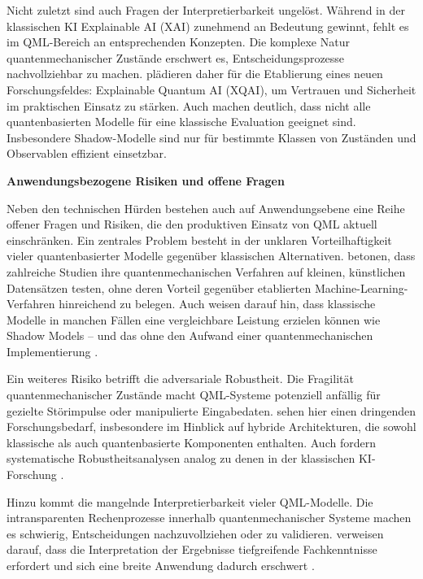 Nicht zuletzt sind auch Fragen der Interpretierbarkeit ungelöst. Während in der klassischen KI Explainable AI (XAI) zunehmend an Bedeutung gewinnt, fehlt es im QML-Bereich an entsprechenden Konzepten. Die komplexe Natur quantenmechanischer Zustände erschwert es, Entscheidungsprozesse nachvollziehbar zu machen. \cite[S.~15]{uddin2024} plädieren daher für die Etablierung eines neuen Forschungsfeldes: Explainable Quantum AI (XQAI), um Vertrauen und Sicherheit im praktischen Einsatz zu stärken. Auch \cite[S.~2--3]{jerbi2024} machen deutlich, dass nicht alle quantenbasierten Modelle für eine klassische Evaluation geeignet sind. Insbesondere Shadow-Modelle sind nur für bestimmte Klassen von Zuständen und Observablen effizient einsetzbar.



\vspace{1em}
\noindent\textbf{Anwendungsbezogene Risiken und offene Fragen}

\noindent
Neben den technischen Hürden bestehen auch auf Anwendungsebene eine Reihe offener Fragen und Risiken, die den produktiven Einsatz von QML aktuell einschränken. Ein zentrales Problem besteht in der unklaren Vorteilhaftigkeit vieler quantenbasierter Modelle gegenüber klassischen Alternativen. \cite{bowles2024} betonen, dass zahlreiche Studien ihre quantenmechanischen Verfahren auf kleinen, künstlichen Datensätzen testen, ohne deren Vorteil gegenüber etablierten Machine-Learning-Verfahren hinreichend zu belegen. Auch \cite{jerbi2024} weisen darauf hin, dass klassische Modelle in manchen Fällen eine vergleichbare Leistung erzielen können wie Shadow Models – und das ohne den Aufwand einer quantenmechanischen Implementierung \cite[S.~2]{jerbi2024}.

Ein weiteres Risiko betrifft die adversariale Robustheit. Die Fragilität quantenmechanischer Zustände macht QML-Systeme potenziell anfällig für gezielte Störimpulse oder manipulierte Eingabedaten. \cite{gujju2024} sehen hier einen dringenden Forschungsbedarf, insbesondere im Hinblick auf hybride Architekturen, die sowohl klassische als auch quantenbasierte Komponenten enthalten. Auch \cite{uddin2024} fordern systematische Robustheitsanalysen analog zu denen in der klassischen KI-Forschung \cite[S.~15]{uddin2024}.

Hinzu kommt die mangelnde Interpretierbarkeit vieler QML-Modelle. Die intransparenten Rechenprozesse innerhalb quantenmechanischer Systeme machen es schwierig, Entscheidungen nachzuvollziehen oder zu validieren. \cite{tychola2023} verweisen darauf, dass die Interpretation der Ergebnisse tiefgreifende Fachkenntnisse erfordert und sich eine breite Anwendung dadurch erschwert \cite[S.~11]{tychola2023}.

